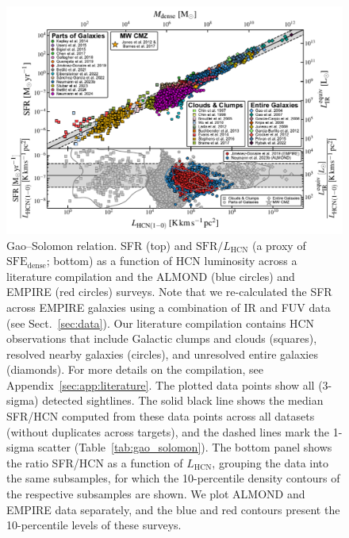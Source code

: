 \documentclass[letter, longauth]{aa} %
\newcommand*{\lhcn}{\ensuremath{L_{\text{HCN}}}\xspace}  %
\newcommand*{\sfedense}{\ensuremath{\text{SFE}_{\text{dense}}}\xspace}  %
\begin{document}
\begin{figure}
\centering
\includegraphics[width=\textwidth]{Figures/GS_relation_literature_compilation_compressed.pdf}
\caption{Gao--Solomon relation. SFR (top) and $\mathrm{SFR}/\lhcn$ (a proxy of \sfedense; bottom) as a function of HCN luminosity across a literature compilation and the ALMOND (blue circles) and EMPIRE (red circles) surveys.
Note that we re-calculated the SFR across EMPIRE galaxies using a combination of IR and FUV data (see Sect.~\ref{sec:data}).
Our literature compilation contains HCN observations that include Galactic clumps and clouds (squares), resolved nearby galaxies (circles), and unresolved entire galaxies (diamonds).
For more details on the compilation, see Appendix~\ref{sec:app:literature}.
The plotted data points show all (3-sigma) detected sightlines.
The solid black line shows the median SFR/HCN computed from these data points across all datasets (without duplicates across targets), and the dashed lines mark the 1-sigma scatter (Table~\ref{tab:gao_solomon}).
The bottom panel shows the ratio SFR/HCN as a function of \lhcn, grouping the data into the same subsamples, for which the 10-percentile density contours of the respective subsamples are shown.
We plot ALMOND and EMPIRE data separately, and the blue and red contours present the 10-percentile levels of these surveys.
}
\label{fig:gao_solomon_relation}
\end{figure}
\end{document}

